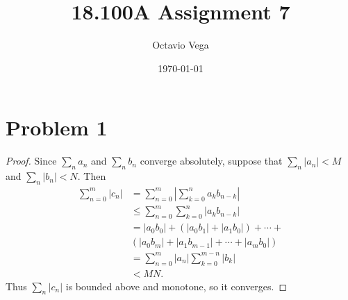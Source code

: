 \documentclass{article}
\title{18.100A Assignment 7}
\author{Octavio Vega}
\date\today
\begin{document}
\maketitle
	
\section*{Problem 1}
\begin{proof}
	Since $\sum_n a_n$ and $\sum_n b_n$ converge absolutely, suppose that $\sum_n |a_n| < M$ and $\sum_n |b_n| < N$. Then
	\begin{align}
		\sum_{n=0}^{m}|c_n| &= \sum_{n=0}^m \left|\sum_{k=0}^n a_k b_{n-k}\right| \\
		& \leq \sum_{n=0}^m \sum_{k=0}^n |a_k b_{n-k}| \\
		&= |a_0 b_0| + (|a_0 b_1| + |a_1 b_0|) + \cdots + \nonumber \\&(|a_0 b_m | + |a_1 b_{m-1}| + \cdots + |a_m b_0|) \\
		&= \sum_{n=0}^m |a_n| \sum_{k=0}^{m-n}|b_k| \\
		&< MN.
	\end{align}
	Thus $\sum_n |c_n|$ is bounded above and monotone, so it converges.
\end{proof}

	
\end{document}
